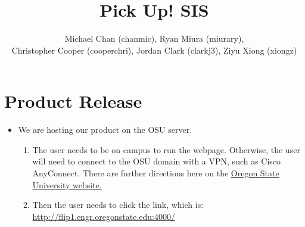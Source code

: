 \documentclass[a4paper]{article}
\title{Pick Up! SIS}
\author{Michael Chan (chanmic), Ryan Miura (miurary), \\Christopher Cooper (cooperchri), Jordan Clark (clarkj3), Ziyu Xiong (xiongz)}
\begin{document}
\maketitle

\section{Product Release}
\begin{itemize}
\item We are hosting our product on the OSU server. 
\begin{enumerate}
\item The user needs to be on campus to run the webpage. Otherwise, the user will need to connect to the OSU domain with a VPN, such as Cisco AnyConnect. There are further directions here on the \href{http://oregonstate.edu/helpdocs/network-and-phone/virtual-private-network-vpn/}{Oregon State University website.}
\item Then the user needs to click the link, which is: 
\url{http://flip1.engr.oregonstate.edu:4000/}
\end{enumerate}
\end{itemize}
\end{document}
